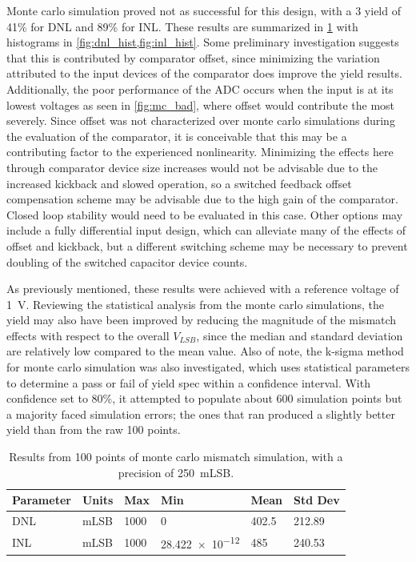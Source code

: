 \documentclass[11pt,letterpaper]{article}
\begin{document}
Monte carlo simulation proved not as successful for this design, with a \qty{3}{\sig} yield of 41\% for DNL and 89\% for INL\@. These results are summarized in \cref{tab:mc_results} with histograms in \cref{fig:dnl_hist,fig:inl_hist}. Some preliminary investigation suggests that this is contributed by comparator offset, since minimizing the variation attributed to the input devices of the comparator does improve the yield results. Additionally, the poor performance of the ADC occurs when the input is at its lowest voltages as seen in \cref{fig:mc_bad}, where offset would contribute the most severely. Since offset was not characterized over monte carlo simulations during the evaluation of the comparator, it is conceivable that this may be a contributing factor to the experienced nonlinearity. Minimizing the effects here through comparator device size increases would not be advisable due to the increased kickback and slowed operation, so a switched feedback offset compensation scheme may be advisable due to the high gain of the comparator. Closed loop stability would need to be evaluated in this case. Other options may include a fully differential input design, which can alleviate many of the effects of offset and kickback, but a different switching scheme may be necessary to prevent doubling of the switched capacitor device counts.

As previously mentioned, these results were achieved with a reference voltage of \qty{1}{\V}. Reviewing the statistical analysis from the monte carlo simulations, the yield may also have been improved by reducing the magnitude of the mismatch effects with respect to the overall \(V_{LSB}\), since the median and standard deviation are relatively low compared to the mean value. Also of note, the k-sigma method for monte carlo simulation was also investigated, which uses statistical parameters to determine a pass or fail of yield spec within a confidence interval. With confidence set to 80\%, it attempted to populate about 600 simulation points but a majority faced simulation errors; the ones that ran produced a slightly better yield than from the raw 100 points.

\begin{table}[htbp!]
    \centering
    \begin{tabular}{llllll}
    \toprule
        \textbf{Parameter} & \textbf{Units} & \textbf{Max} & \textbf{Min} & \textbf{Mean} & \textbf{Std Dev} \\
    \midrule
        DNL & mLSB & 1000 & 0 & 402.5 & 212.89 \\
        INL & mLSB & 1000 & \qty{28.422e-12}{} & 485 & 240.53 \\
    \bottomrule
    \end{tabular}
    \caption{Results from 100 points of monte carlo mismatch simulation, with a precision of \qty{250}{mLSB}.}\label{tab:mc_results}
\end{table}
\end{document}
